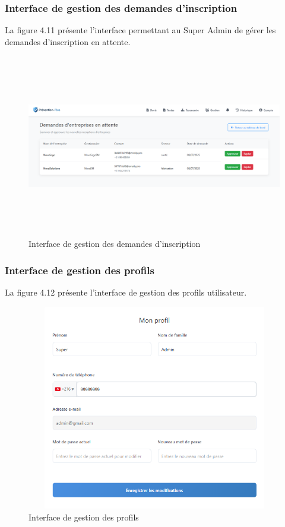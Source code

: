 \subsubsection{Interface de gestion des demandes d'inscription}
\noindent La figure 4.11 présente l'interface permettant au Super Admin de gérer les demandes d'inscription en attente.

\begin{figure}[H]
    \centering
    \includegraphics[width=15cm,height=8cm]{images/approvepic.PNG}
    \caption{Interface de gestion des demandes d'inscription}
\end{figure}

\subsubsection{Interface de gestion des profils}
\noindent La figure 4.12 présente l'interface de gestion des profils utilisateur.

\begin{figure}[H]
    \centering
    \includegraphics[width=14cm,height=9cm]{images/profilepic.PNG}
    \caption{Interface de gestion des profils}
\end{figure}

